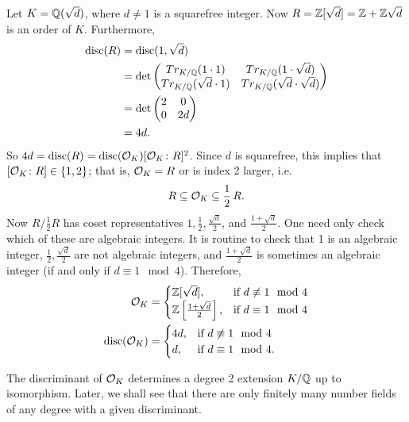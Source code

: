 \begin{ex}
Let $K=\mathbb{Q}(\sqrt{d})$, where $d \neq 1$ is a squarefree integer. Now $R=\mathbb{Z}[\sqrt{d}]=\mathbb{Z} + \mathbb{Z} \sqrt{d}$ is an order of $K$. Furthermore,
	\[
	\begin{split}
	\operatorname{disc}(R)&= \operatorname{disc}(1,\sqrt{d}) \\
	&= \det \begin{pmatrix}
	Tr_{K/\mathbb{Q}}(1 \cdot 1) & Tr_{K/\mathbb{Q}}(1 \cdot \sqrt{d}) \\
	Tr_{K/\mathbb{Q}}(\sqrt{d} \cdot 1) & Tr_{K/\mathbb{Q}}(\sqrt{d} \cdot \sqrt{d})
	\end{pmatrix} \\
	&= \det \begin{pmatrix} 2 & 0 \\ 0 & 2d \end{pmatrix} \\
	&=4d.
	\end{split}
	\]
So $4d=\operatorname{disc}(R)=\operatorname{disc}(\mathcal{O}_K) [\mathcal{O}_K \colon R]^2$. Since $d$ is squarefree, this implies that $[\mathcal{O}_K \colon R] \in \{1,2\}$; that is, $\mathcal{O}_K=R$ or is index 2 larger, i.e.	
	\[
	R \subseteq \mathcal{O}_K \subseteq \dfrac{1}{2}\, R.
	\]
Now $R/\frac{1}{2}R$ has coset representatives $1, \frac{1}{2}, \frac{\sqrt{d}}{2}$, and $\frac{1+\sqrt{d}}{2}$. One need only check which of these are algebraic integers. It is routine to check that 1 is an algebraic integer, $\frac{1}{2}, \frac{\sqrt{d}}{2}$ are not algebraic integers, and $\frac{1+\sqrt{d}}{2}$ is sometimes an algebraic integer (if and only if $d \equiv 1 \mod 4$). Therefore,
	\[
	\begin{split}
	\mathcal{O}_K&=
	\begin{cases}
	\mathbb{Z}[\sqrt{d}], & \text{if } d \not\equiv 1 \mod 4 \\
	\mathbb{Z}\left[\frac{1+\sqrt{d}}{2}\right], & \text{if } d \equiv 1 \mod 4
	\end{cases} \\
	\operatorname{disc}(\mathcal{O}_K)&=
	\begin{cases}
	4d, & \text{if } d \not\equiv 1 \mod 4 \\
	d, & \text{if } d \equiv 1 \mod 4.
	\end{cases}
	\end{split}
	\] \xqed
\end{ex}

\begin{rem}
The discriminant of $\mathcal{O}_K$ determines a degree 2 extension $K/\mathbb{Q}$ up to isomorphism. Later, we shall see that there are only finitely many number fields of any degree with a given discriminant. 
\end{rem}


